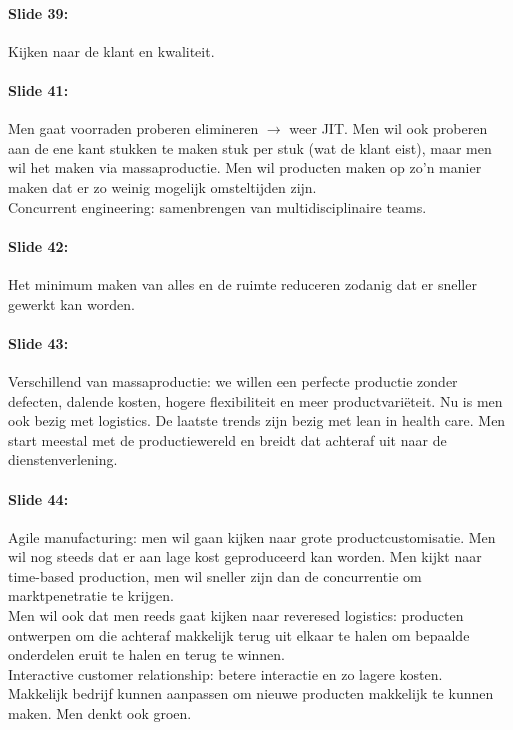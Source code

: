 \documentclass[10pt,a4paper]{report}
\begin{document}
\paragraph{Slide 39:} Kijken naar de klant en kwaliteit. 

\paragraph{Slide 41:} Men gaat voorraden proberen elimineren $\rightarrow$ weer JIT. Men wil ook proberen aan de ene kant stukken te maken stuk per stuk (wat de klant eist), maar men wil het maken via massaproductie. Men wil producten maken op zo'n manier maken dat er zo weinig mogelijk omsteltijden zijn.\\
Concurrent engineering: samenbrengen van multidisciplinaire teams.

\paragraph{Slide 42:} Het minimum maken van alles en de ruimte reduceren zodanig dat er sneller gewerkt kan worden.

\paragraph{Slide 43:} Verschillend van massaproductie: we willen een perfecte productie zonder defecten, dalende kosten, hogere flexibiliteit en meer productvari\"eteit. Nu is men ook bezig met logistics. De laatste trends zijn bezig met lean in health care. Men start meestal met de productiewereld en breidt dat achteraf uit naar de dienstenverlening.

\paragraph{Slide 44:} Agile manufacturing: men wil gaan kijken naar grote productcustomisatie. Men wil nog steeds dat er aan lage kost geproduceerd kan worden. Men kijkt naar time-based production, men wil sneller zijn dan de concurrentie om marktpenetratie te krijgen.\\
Men wil ook dat men reeds gaat kijken naar reveresed logistics: producten ontwerpen om die achteraf makkelijk terug uit elkaar te halen om bepaalde onderdelen eruit te halen en terug te winnen.\\
Interactive customer relationship: betere interactie en zo lagere kosten.\\
Makkelijk bedrijf kunnen aanpassen om nieuwe producten makkelijk te kunnen maken.
Men denkt ook groen.
\end{document}

